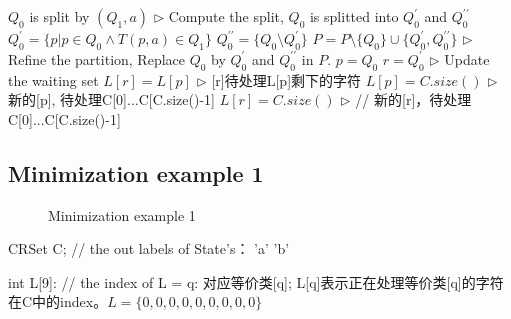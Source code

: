 \begin{algorithm}[htbp]
\begin{algorithmic}[1]
				\State $Q_0$ is split by $(Q_1,a)$  \qquad\qquad $\triangleright$ Compute the split, $Q_0$ is splitted into $Q_0^\prime$ and $Q_0^{\prime\prime}$
				\State $Q_0^{\prime}=\{p|p\in Q_0\land T(p,a)\in Q_1\}$ 
				\State $Q_0^{\prime\prime}=\{Q_0\setminus Q_0^\prime\}$
				\State $P=P\setminus \{Q_0\}\cup\{Q_0^\prime, Q_0^{\prime\prime}\}$ \qquad\qquad $\triangleright$ Refine the partition, Replace $Q_0$ by $Q_0^\prime$ and $Q_0^{\prime\prime}$ in $P$.
				\State $p=Q_0$
				\State $r=Q_0^\prime$
				  \qquad\qquad $\triangleright$ Update the waiting set
					\If {($ [p]\le |[r]|$)}
					\State $L[r]=L[p] $ \qquad\qquad $\triangleright$  [r]待处理L[p]剩下的字符
					\State $L[p]=C.size()$  \qquad\qquad $\triangleright$  新的[p], 待处理C[0]...C[C.size()-1]
					\Else
					\State $L[r]=C.size() $ \qquad\qquad $\triangleright$ // 新的[r]，待处理C[0]...C[C.size()-1]
					\EndIf  
				\EndIf 
			\EndFor
		\EndWhile
	\end{algorithmic}
\end{algorithm}

\subsection{Minimization example 1}

\begin{figure} [htbp]
	\centering 
	\caption{ Minimization example 1 } 
	\label{fig:mini-1} 
\end{figure}

CRSet C;  // the out labels of State's：{ 'a'  'b' } 

int L[9]: // the index of L = q: 对应等价类[q]; L[q]表示正在处理等价类[q]的字符在C中的index。$L = \{ 0,0,0,0,0,0,0,0,0 \} $

